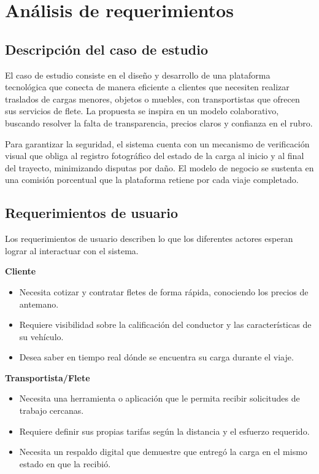 \chapter{Análisis de requerimientos}
\label{Análisis}

 \section{Descripción del caso de estudio}
 
 El caso de estudio consiste en el diseño y desarrollo de una plataforma tecnológica que conecta de manera eficiente a clientes que necesiten realizar traslados de cargas menores, objetos o muebles, con transportistas que ofrecen sus servicios de flete. La propuesta se inspira en un modelo colaborativo, buscando resolver la falta de transparencia, precios claros y confianza en el rubro.
 
 Para garantizar la seguridad, el sistema cuenta con un mecanismo de verificación visual que obliga al registro fotográfico del estado de la carga al inicio y al final del trayecto, minimizando disputas por daño. El modelo de negocio se sustenta en una comisión porcentual que la plataforma retiene por cada viaje completado.
 
 \section{Requerimientos de usuario}
 
 Los requerimientos de usuario describen lo que los diferentes actores esperan lograr al interactuar con el sistema.
 
 \noindent \textbf{Cliente}
 
 \begin{itemize}
 	\item Necesita cotizar y contratar fletes de forma rápida, conociendo los precios de antemano.
 	\item Requiere visibilidad sobre la calificación del conductor y las características de su vehículo.
 	\item Desea saber en tiempo real dónde se encuentra su carga durante el viaje.
 \end{itemize}
 
 \noindent \textbf{Transportista/Flete}
 
 \begin{itemize}
 	\item Necesita una herramienta o aplicación que le permita recibir solicitudes de trabajo cercanas.
 	\item Requiere definir sus propias tarifas según la distancia y el esfuerzo requerido.
 	\item Necesita un respaldo digital que demuestre que entregó la carga en el mismo estado en que la recibió.
 \end{itemize}
 
